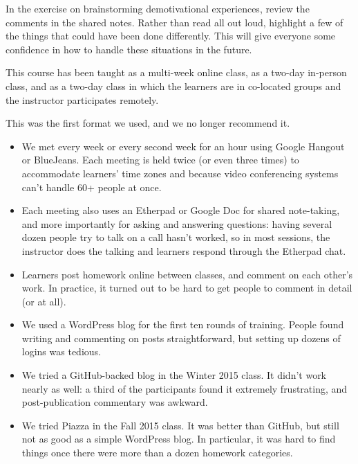 
In the exercise on brainstorming demotivational experiences, review
the comments in the shared notes. Rather than read all out loud,
highlight a few of the things that could have been done
differently. This will give everyone some confidence in how to handle
these situations in the future.


This course has been taught as a multi-week online class, as a two-day
in-person class, and as a two-day class in which the learners are in
co-located groups and the instructor participates remotely.


This was the first format we used, and we no longer recommend it.

\begin{itemize}

\item
  We met every week or every second week for an hour using Google
  Hangout or BlueJeans. Each meeting is held twice (or even three
  times) to accommodate learners' time zones and because video
  conferencing systems can't handle 60+ people at once.

\item
  Each meeting also uses an Etherpad or Google Doc for shared
  note-taking, and more importantly for asking and answering
  questions: having several dozen people try to talk on a call hasn't
  worked, so in most sessions, the instructor does the talking and
  learners respond through the Etherpad chat.

\item
  Learners post homework online between classes, and comment on each
  other's work.  In practice, it turned out to be hard to get people
  to comment in detail (or at all).

\item
  We used a WordPress blog for the first ten rounds of training.
  People found writing and commenting on posts straightforward, but
  setting up dozens of logins was tedious.

\item
  We tried a GitHub-backed blog in the Winter 2015 class. It didn't
  work nearly as well: a third of the participants found it extremely
  frustrating, and post-publication commentary was awkward.

\item
  We tried Piazza in the Fall 2015 class. It was better than GitHub,
  but still not as good as a simple WordPress blog. In particular, it
  was hard to find things once there were more than a dozen homework
  categories.

\end{itemize}

